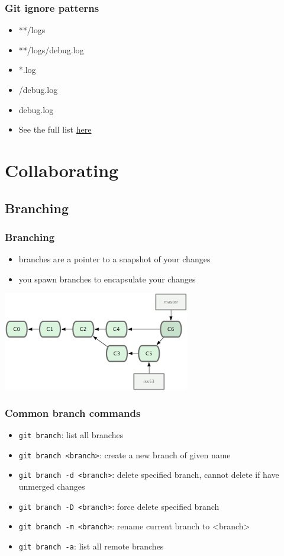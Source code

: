 \documentclass[12pt]{beamer}
\begin{document}
\begin{frame}
\frametitle{Git ignore patterns}
\begin{itemize}
	\item **/logs
	\item **/logs/debug.log
	\item *.log
	\item /debug.log
	\item debug.log
	\item See the full list \href{https://www.atlassian.com/git/tutorials/saving-changes/gitignore}{here}
\end{itemize}
\end{frame}

\section{Collaborating}
\subsection{Branching}
\begin{frame}
\frametitle{Branching}
\begin{itemize}
	\item branches are a pointer to a snapshot of your changes
	\item you spawn branches to encapsulate your changes
\end{itemize}
\begin{center}
	\includegraphics[width=0.5\linewidth]{branching}
\end{center}
\end{frame}

\begin{frame}
\frametitle{Common branch commands}
\begin{itemize}
	\item \texttt{git branch}: list all branches
	\item \texttt{git branch <branch>}: create a new branch of given name
	\item \texttt{git branch -d <branch>}: delete specified branch, cannot delete if have unmerged changes
	\item \texttt{git branch -D <branch>}: force delete specified branch
	\item \texttt{git branch -m <branch>}: rename current branch to <branch>
	\item \texttt{git branch -a}: list all remote branches
\end{itemize}
\end{frame}
\end{document}

